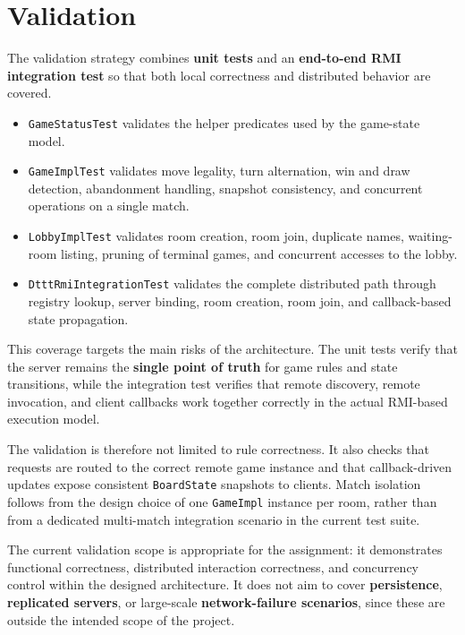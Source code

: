 \clearpage
\section{Validation}

The validation strategy combines \textbf{unit tests} and an
\textbf{end-to-end RMI integration test} so that both local correctness and
distributed behavior are covered.

\begin{itemize}
    \item \texttt{GameStatusTest} validates the helper predicates used by the
    game-state model.
    \item \texttt{GameImplTest} validates move legality, turn alternation, win
    and draw detection, abandonment handling, snapshot consistency, and
    concurrent operations on a single match.
    \item \texttt{LobbyImplTest} validates room creation, room join, duplicate
    names, waiting-room listing, pruning of terminal games, and concurrent
    accesses to the lobby.
    \item \texttt{DtttRmiIntegrationTest} validates the complete distributed
    path through registry lookup, server binding, room creation, room join, and
    callback-based state propagation.
\end{itemize}

This coverage targets the main risks of the architecture. The unit tests verify
that the server remains the \textbf{single point of truth} for game rules and
state transitions, while the integration test verifies that remote discovery,
remote invocation, and client callbacks work together correctly in the actual
RMI-based execution model.

The validation is therefore not limited to rule correctness. It also checks
that requests are routed to the correct remote game instance and that
callback-driven updates expose consistent \texttt{BoardState} snapshots to
clients. Match isolation follows from the design choice of one
\texttt{GameImpl} instance per room, rather than from a dedicated multi-match
integration scenario in the current test suite.

The current validation scope is appropriate for the assignment: it demonstrates
functional correctness, distributed interaction correctness, and concurrency
control within the designed architecture. It does not aim to cover
\textbf{persistence}, \textbf{replicated servers}, or large-scale
\textbf{network-failure scenarios}, since these are outside the intended scope
of the project.
